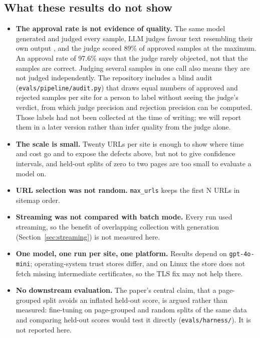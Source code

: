 \documentclass[11pt]{article}
\begin{document}
\subsection{What these results do not show}
\label{sec:eval-limits}
\begin{itemize}[leftmargin=1.5em]
  \item \textbf{The approval rate is not evidence of quality.} The same
    model generated and judged every sample, LLM judges favour text
    resembling their own output \cite{panickssery2024selfpref}, and the
    judge scored 89\% of approved samples at the maximum. An approval rate
    of 97.6\% says that the judge rarely objected, not that the samples are
    correct. Judging several samples in one call also means they are not
    judged independently. The repository includes a blind audit
    (\texttt{evals/pipeline/audit.py}) that draws equal numbers of approved
    and rejected samples per site for a person to label without seeing the
    judge's verdict, from which judge precision and rejection precision
    can be computed. Those labels had not been collected at the time of
    writing; we will report them in a later version rather than infer
    quality from the judge alone.
  \item \textbf{The scale is small.} Twenty URLs per site is enough to
    show where time and cost go and to expose the defects above, but not
    to give confidence intervals, and held-out splits of zero to two pages
    are too small to evaluate a model on.
  \item \textbf{URL selection was not random.} \texttt{max\_urls} keeps
    the first N URLs in sitemap order.
  \item \textbf{Streaming was not compared with batch mode.} Every run
    used streaming, so the benefit of overlapping collection with
    generation (Section~\ref{sec:streaming}) is not measured here.
  \item \textbf{One model, one run per site, one platform.} Results
    depend on \texttt{gpt-4o-mini}; operating-system trust stores differ,
    and on Linux the store does not fetch missing intermediate
    certificates, so the TLS fix may not help there.
  \item \textbf{No downstream evaluation.} The paper's central claim, that
    a page-grouped split avoids an inflated held-out score, is argued
    rather than measured: fine-tuning on page-grouped and random splits of
    the same data and comparing held-out scores would test it directly
    (\texttt{evals/harness/}). It is not reported here.
\end{itemize}
\end{document}
